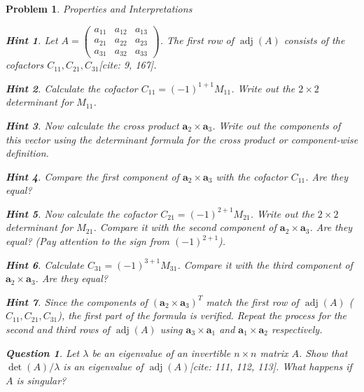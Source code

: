\documentclass[12pt]{article}
\newtheorem{problem}{Problem}[section]
\newtheorem{question}{Question}[problem]
\theoremstyle{definition}
\newtheorem{hint}{Hint}[question]
\newcommand{\adj}{\operatorname{adj}}
\newcommand{\detm}{\operatorname{det}}
\begin{document}
\begin{problem}{Properties and Interpretations}
        \begin{hint}
            Let $A = \begin{pmatrix} a_{11} & a_{12} & a_{13} \\ a_{21} & a_{22} & a_{23} \\ a_{31} & a_{32} & a_{33} \end{pmatrix}$. The first row of $\adj(A)$ consists of the cofactors $C_{11}, C_{21}, C_{31}$[cite: 9, 167].
        \end{hint}
        \begin{hint}
            Calculate the cofactor $C_{11} = (-1)^{1+1} M_{11}$. Write out the $2 \times 2$ determinant for $M_{11}$.
        \end{hint}
        \begin{hint}
            Now calculate the cross product $\mathbf{a}_2 \times \mathbf{a}_3$. Write out the components of this vector using the determinant formula for the cross product or component-wise definition.
        \end{hint}
        \begin{hint}
            Compare the first component of $\mathbf{a}_2 \times \mathbf{a}_3$ with the cofactor $C_{11}$. Are they equal?
        \end{hint}
        \begin{hint}
            Now calculate the cofactor $C_{21} = (-1)^{2+1} M_{21}$. Write out the $2 \times 2$ determinant for $M_{21}$. Compare it with the second component of $\mathbf{a}_2 \times \mathbf{a}_3$. Are they equal? (Pay attention to the sign from $(-1)^{2+1}$).
        \end{hint}
         \begin{hint}
             Calculate $C_{31} = (-1)^{3+1} M_{31}$. Compare it with the third component of $\mathbf{a}_2 \times \mathbf{a}_3$. Are they equal?
         \end{hint}
         \begin{hint}
             Since the components of $(\mathbf{a}_2 \times \mathbf{a}_3)^T$ match the first row of $\adj(A)$ ($C_{11}, C_{21}, C_{31}$), the first part of the formula is verified. Repeat the process for the second and third rows of $\adj(A)$ using $\mathbf{a}_3 \times \mathbf{a}_1$ and $\mathbf{a}_1 \times \mathbf{a}_2$ respectively.
         \end{hint}
    

    \begin{question}
       Let $\lambda$ be an eigenvalue of an invertible $n \times n$ matrix $A$. Show that $\detm(A)/\lambda$ is an eigenvalue of $\adj(A)$[cite: 111, 112, 113]. What happens if $A$ is singular?
    \end{question}
     

\end{problem}
\end{document}
